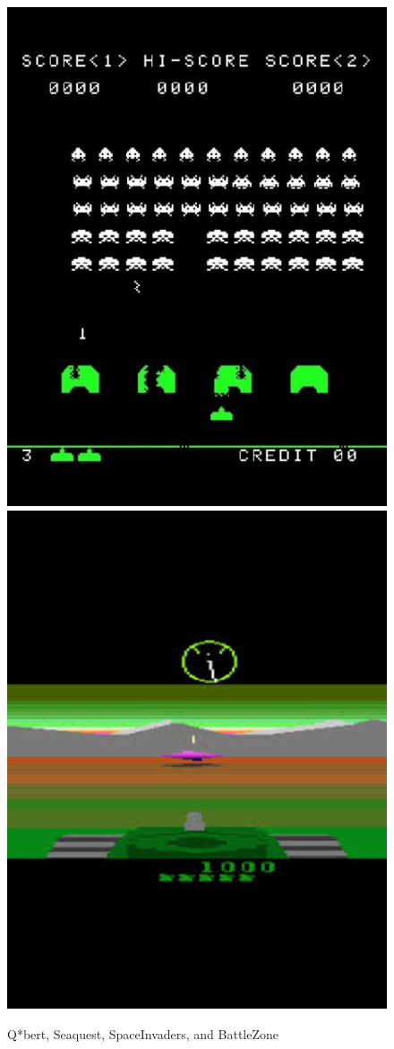 \documentclass{article}
\begin{document}
\begin{figure}[h]
\begin{minipage}{0.8\textwidth}
            \centering
            \includegraphics[scale=0.15]{SpaceInvaders}
            \centering
            \includegraphics[scale=0.15]{BattleZone}
        \end{minipage}
        \caption{Q*bert, Seaquest, SpaceInvaders, and BattleZone}
    \end{figure}
\end{document}
